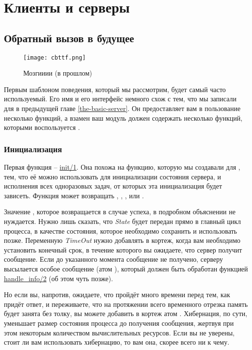 \chapter{Клиенты и серверы}
\label{clients-and-servers}
\section{Обратный вызов в будущее}
\label{callback-to-the-future}
\begin{wrapfigure}{l}{0.35\linewidth}
    \caption{Мозгииии (в прошлом)}
    \texttt{[image: cbttf.png]}
\end{wrapfigure}
Первым шаблоном поведения, который мы рассмотрим, будет самый часто используемый.
Его имя  и его интерфейс немного схож с тем, что мы записали для  в предыдущей главе \ref{the-basic-server}. Он предоставляет вам в пользование несколько функций, а взамен ваш модуль должен содержать несколько функций, которыми воспользуется .
\subsection{Инициализация}
\label{init}
Первая функция \--- \href{http://erldocs.com/R15B/stdlib/gen\_server.html#init/1}{init/1}.
Она похожа на функцию, которую мы создавали  для , тем, что её можно использовать для инициализации состояния сервера, и исполнения всех одноразовых задач, от которых эта инициализация будет зависеть.
Функция может возвращать , , ,  или .

Значение , которое возвращается в случае успеха, в подробном объяснении не нуждается.
Нужно лишь сказать, что \emph{State} будет передан прямо в главный цикл процесса, в качестве состояния, которое необходимо сохранить и использовать позже.
Переменную \emph{TimeOut} нужно добавлять в кортеж, когда вам необходимо установить конечный срок, в течение которого вы ожидаете, что сервер получит сообщение.
Если до указанного момента сообщение не получено, серверу высылается особое сообщение (атом ), который должен быть обработан функцией \href{http://erldocs.com/R15B/stdlib/gen\_server.html#handle\_info/2}{handle\_info/2} (об этом чуть позже).

Но если вы, напротив, ожидаете, что пройдёт много времени перед тем, как придёт ответ, и переживаете, что на протяжении всего временного отрезка память будет занята без толку, вы можете добавить в кортеж атом .
Хибернация, по сути, уменьшает размер состояния процесса до получения сообщения, жертвуя при этом некоторым количеством вычислительных ресурсов.
Если вы не уверены, стоит ли вам использовать хибернацию, то вам она, скорее всего ни к чему.

